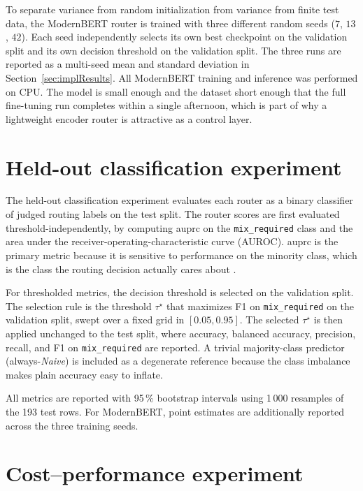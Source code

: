 \documentclass[english, bibtex]{kththesis}               %
\numberwithin{listing}{chapter}
\begin{document}
To separate variance from random initialization from variance from finite test data, the ModernBERT router is trained with three different random seeds ($7$, $13$, $42$). Each seed independently selects its own best checkpoint on the validation split and its own decision threshold on the validation split. The three runs are reported as a multi-seed mean and standard deviation in Section~\ref{sec:implResults}. All ModernBERT training and inference was performed on CPU. The model is small enough and the dataset short enough that the full fine-tuning run completes within a single afternoon, which is part of why a lightweight encoder router is attractive as a control layer.

\section{Held-out classification experiment}
\label{sec:implClassification}

The held-out classification experiment evaluates each router as a binary classifier of judged routing labels on the test split. The router scores are first evaluated threshold-independently, by computing \gls{auprc} on the \texttt{mix\_required} class and the area under the receiver-operating-characteristic curve (AUROC). \Gls{auprc} is the primary metric because it is sensitive to performance on the minority class, which is the class the routing decision actually cares about \cite{saito2015precision}.

For thresholded metrics, the decision threshold is selected on the validation split. The selection rule is the threshold $\tau^\star$ that maximizes F1 on \texttt{mix\_required} on the validation split, swept over a fixed grid in $[0.05, 0.95]$. The selected $\tau^\star$ is then applied unchanged to the test split, where accuracy, balanced accuracy, precision, recall, and F1 on \texttt{mix\_required} are reported. A trivial majority-class predictor (always-\emph{Naive}) is included as a degenerate reference because the class imbalance makes plain accuracy easy to inflate.

All metrics are reported with 95\,\% bootstrap intervals using 1\,000 resamples of the 193 test rows. For ModernBERT, point estimates are additionally reported across the three training seeds.

\section{Cost--performance experiment}
\label{sec:implPolicy}
\end{document}
